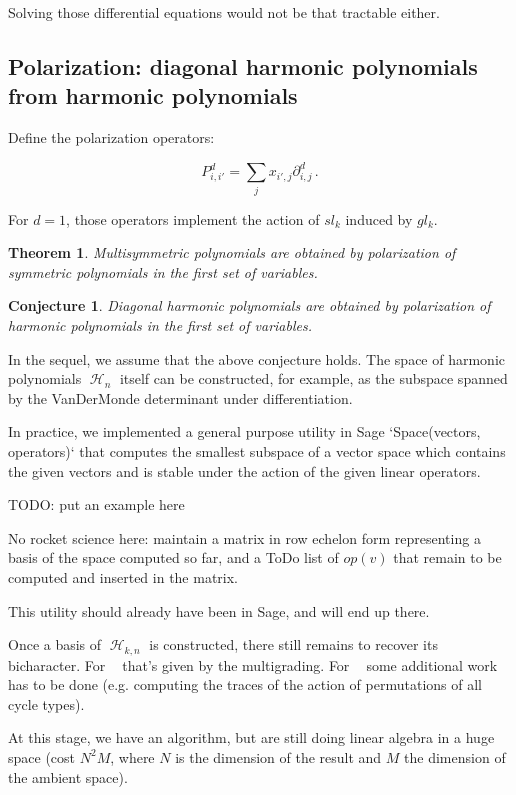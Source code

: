 \documentclass[letter,12pt]{article}
\DeclareMathOperator{\Sn}{\mathbb{S}_n}
\DeclareMathOperator{\GLr}{GL_r}
\DeclareMathOperator{\harmonics}{\mathcal{H}}
\newtheorem{theorem}{Theorem}
\newtheorem{conjecture}{Conjecture}
\begin{document}
	Solving those differential equations would not be that tractable either.
	
	\subsection{Polarization: diagonal harmonic polynomials from harmonic polynomials}
	
	Define the polarization operators:
	
	$$P_{i,i'}^d = \sum_j   x_{i',j} \partial_{i,j}^d\,.$$
	
	For $d=1$, those operators implement the action of $sl_k$ induced by $gl_k$.
	
	\begin{theorem}
		Multisymmetric polynomials are obtained by polarization of symmetric polynomials in the first set of variables.
	\end{theorem}
	
	\begin{conjecture}
		Diagonal harmonic polynomials are obtained by polarization of harmonic polynomials in the first set of variables.
	\end{conjecture}
	
	In the sequel, we assume that the above conjecture holds. The space of harmonic polynomials $\harmonics_n$ itself can be constructed, for example, as the subspace spanned by the VanDerMonde determinant under differentiation.
	
	In practice, we implemented a general purpose utility in Sage `Space(vectors, operators)` that computes the smallest subspace of a vector space which contains the given vectors and is stable under the action of the given linear operators.
	
	TODO: put an example here
	
	No rocket science here: maintain a matrix in row echelon form representing a basis of the space computed so far, and a ToDo list of $op(v)$ that remain to be computed and inserted in the matrix.
	
	This utility should already have been in Sage, and will end up there.
	
	Once a basis of $\harmonics_{k,n}$ is constructed, there still remains to recover its bicharacter. For $\GLr$ that's given by the multigrading. For $\Sn$ some additional work has to be done (e.g. computing the traces of the action of permutations of all cycle types).
	
	At this stage, we have an algorithm, but are still doing linear algebra in a huge space (cost $N^2 M$, where $N$ is the dimension of the result and $M$ the dimension of the ambient space).
	
\end{document}
